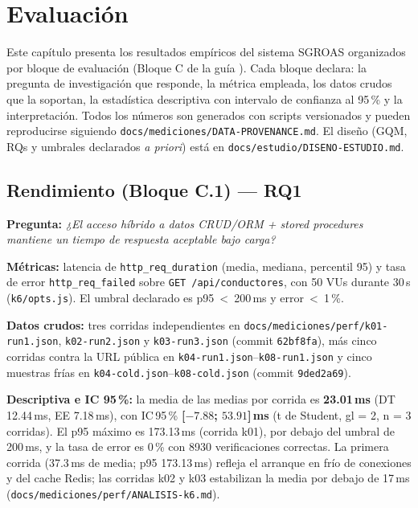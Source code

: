 \chapter{Evaluación}
\label{cap:evaluacion}

Este capítulo presenta los resultados empíricos del sistema SGROAS organizados por
bloque de evaluación (Bloque C de la guía \cite{uteq2026guia}). Cada bloque declara:
la pregunta de investigación que responde, la métrica empleada, los datos crudos que
la soportan, la estadística descriptiva con intervalo de confianza al 95\,\% y la
interpretación. Todos los números son generados con scripts versionados y pueden
reproducirse siguiendo \texttt{docs/mediciones/DATA-PROVENANCE.md}. El diseño
(GQM, RQs y umbrales declarados \emph{a priori}) está en
\texttt{docs/estudio/DISENO-ESTUDIO.md}.

\section{Rendimiento (Bloque C.1) — RQ1}
\label{sec:perf}

\textbf{Pregunta:} \emph{¿El acceso híbrido a datos CRUD/ORM + stored procedures
mantiene un tiempo de respuesta aceptable bajo carga?}

\textbf{Métricas:} latencia de \texttt{http\_req\_duration} (media, mediana,
percentil 95) y tasa de error \texttt{http\_req\_failed} sobre
\texttt{GET /api/conductores}, con 50 VUs durante 30\,s (\texttt{k6/opts.js}).
El umbral declarado es p95~<~200\,ms y error~<~1\,\%.

\textbf{Datos crudos:} tres corridas independientes en
\texttt{docs/mediciones/perf/k01-run1.json}, \texttt{k02-run2.json} y
\texttt{k03-run3.json} (commit \texttt{62bf8fa}), más cinco corridas contra la URL
pública en \texttt{k04-run1.json}--\texttt{k08-run1.json} y cinco muestras frías en
\texttt{k04-cold.json}--\texttt{k08-cold.json} (commit \texttt{9ded2a69}).

\textbf{Descriptiva e IC 95\,\%:} la media de las medias por corrida es
\textbf{23.01\,ms} (DT 12.44\,ms, EE 7.18\,ms), con IC\,95\,\%
\textbf{[$-7.88$; $53.91$]\,ms} (t de Student, gl = 2, n = 3 corridas). El p95
máximo es 173.13\,ms (corrida k01), por debajo del umbral de 200\,ms, y la tasa de
error es 0\,\% con 8930 verificaciones correctas. La primera corrida (37.3\,ms de
media; p95 173.13\,ms) refleja el arranque en frío de conexiones y del cache
Redis; las corridas k02 y k03 estabilizan la media por debajo de 17\,ms
(\texttt{docs/mediciones/perf/ANALISIS-k6.md}).

